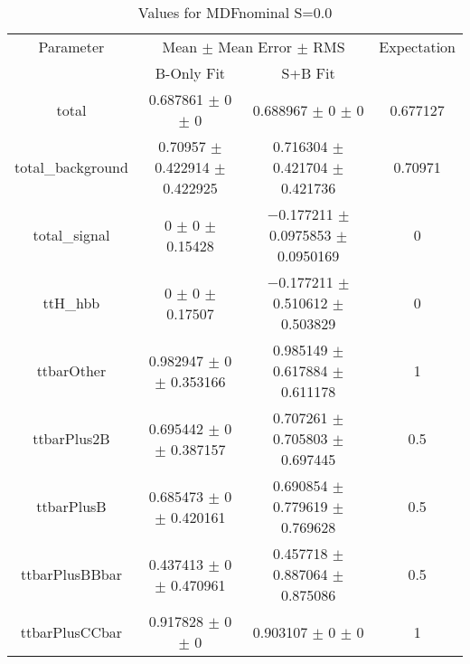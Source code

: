 \begin{table}
\centering
\caption{Values for MDFnominal S=0.0}
\begin{tabular}{cccc}
\toprule
Parameter & \multicolumn{2}{c}{Mean $\pm$ Mean Error $\pm$ RMS} & Expectation\\
 & B-Only Fit & S+B Fit & \\
\midrule
total & \num{0.687861} $\pm$ \num{0} $\pm$ \num{0} & \num{0.688967} $\pm$ \num{0} $\pm$ \num{0} & \num{0.677127}\\
total\_background & \num{0.70957} $\pm$ \num{0.422914} $\pm$ \num{0.422925} & \num{0.716304} $\pm$ \num{0.421704} $\pm$ \num{0.421736} & \num{0.70971}\\
total\_signal & \num{0} $\pm$ \num{0} $\pm$ \num{0.15428} & \num{-0.177211} $\pm$ \num{0.0975853} $\pm$ \num{0.0950169} & \num{0}\\
ttH\_hbb & \num{0} $\pm$ \num{0} $\pm$ \num{0.17507} & \num{-0.177211} $\pm$ \num{0.510612} $\pm$ \num{0.503829} & \num{0}\\
ttbarOther & \num{0.982947} $\pm$ \num{0} $\pm$ \num{0.353166} & \num{0.985149} $\pm$ \num{0.617884} $\pm$ \num{0.611178} & \num{1}\\
ttbarPlus2B & \num{0.695442} $\pm$ \num{0} $\pm$ \num{0.387157} & \num{0.707261} $\pm$ \num{0.705803} $\pm$ \num{0.697445} & \num{0.5}\\
ttbarPlusB & \num{0.685473} $\pm$ \num{0} $\pm$ \num{0.420161} & \num{0.690854} $\pm$ \num{0.779619} $\pm$ \num{0.769628} & \num{0.5}\\
ttbarPlusBBbar & \num{0.437413} $\pm$ \num{0} $\pm$ \num{0.470961} & \num{0.457718} $\pm$ \num{0.887064} $\pm$ \num{0.875086} & \num{0.5}\\
ttbarPlusCCbar & \num{0.917828} $\pm$ \num{0} $\pm$ \num{0} & \num{0.903107} $\pm$ \num{0} $\pm$ \num{0} & \num{1}\\
\bottomrule
\end{tabular}
\end{table}